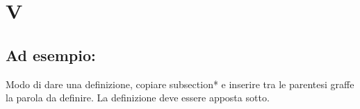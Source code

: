 \section*{V}
\markright{}
\subsection*{Ad esempio:}
Modo di dare una definizione, copiare subsection*{} e inserire tra le parentesi graffe la parola da definire. La definizione deve essere apposta sotto.